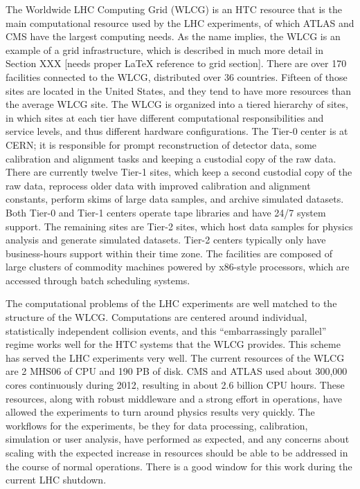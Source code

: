The Worldwide LHC Computing Grid (WLCG) is an HTC resource that is the main computational resource used by the LHC experiments, of which ATLAS and CMS have the largest computing needs.  As the name implies, the WLCG is an example of a grid infrastructure, which is described in much more detail in Section XXX [needs proper LaTeX reference to grid section].  There are over 170 facilities connected to the WLCG, distributed over 36 countries.  Fifteen of those sites are located in the United States, and they tend to have more resources than the average WLCG site.  The WLCG is organized into a tiered hierarchy of sites, in which sites at each tier have different computational responsibilities and service levels, and thus different hardware configurations.  The Tier-0 center is at CERN; it is responsible for prompt reconstruction of detector data, some calibration and alignment tasks and keeping a custodial copy of the raw data.  There are currently twelve Tier-1 sites, which keep a second custodial copy of the raw data, reprocess older data with improved calibration and alignment constants, perform skims of large data samples, and archive simulated datasets.  Both Tier-0 and Tier-1 centers operate tape libraries and have 24/7 system support.  The remaining sites are Tier-2 sites, which host data samples for physics analysis and generate simulated datasets.  Tier-2 centers typically only have business-hours support within their time zone.  The facilities are composed of large clusters of commodity machines powered by x86-style processors, which are accessed through batch scheduling systems.

The computational problems of the LHC experiments are well matched to the structure of the WLCG.  Computations are centered around individual, statistically independent collision events, and this “embarrassingly parallel” regime works well for the HTC systems that the WLCG provides.  This scheme has served the LHC experiments very well.  The current resources of the WLCG are 2 MHS06 of CPU and 190 PB of disk.  CMS and ATLAS used about 300,000 cores continuously during 2012, resulting in about 2.6 billion CPU hours.  These resources, along with robust middleware and a strong effort in operations, have allowed the experiments to turn around physics results very quickly.  The workflows for the experiments, be they for data processing, calibration, simulation or user analysis, have performed as expected, and any concerns about scaling with the expected increase in resources should be able to be addressed in the course of normal operations.  There is a good window for this work during the current LHC shutdown.


